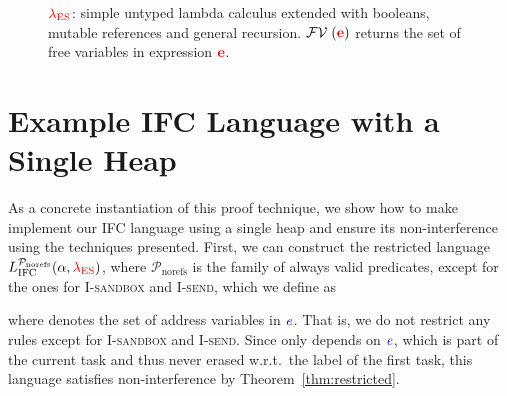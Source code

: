 \documentclass{llncs}
\newcommand{\Varid}[1]{\mathit{#1}}
\newcommand{\Red}[1]{{\color{red} #1}}
\begin{document}
\begin{figure}

\caption{\ensuremath{\Red{\lambda_{\text{ES}}}}: simple untyped lambda calculus extended with booleans,
mutable references and general recursion. \ensuremath{\mathcal{FV}\;(\tar{e})} returns the set of free
variables in expression \ensuremath{\tar{e}}.}
\label{fig:ml-full}
\end{figure}



\section{Example IFC Language with a Single Heap}
\label{sec:single-heap}

As a concrete instantiation of this proof technique, we show
how to make implement our IFC language using a single heap and
ensure its non-interference using the techniques presented.
First, we can construct the restricted language
\ensuremath{L_\text{IFC}^{\mathcal{P}_\text{norefs}}(\alpha,\Red{\lambda_{\text{ES}}})}, where \ensuremath{\mathcal{P}_\text{norefs}} is
the family of always valid predicates, except for the ones for
\textsc{I-sandbox} and \textsc{I-send}, which we define as

where  denotes the set of address variables in \ensuremath{\ifc{\Varid{e}}}.
That is, we do not restrict any rules except for \textsc{I-sandbox}
and \textsc{I-send}.
Since  only depends on \ensuremath{\ifc{\Varid{e}}}, which is part of the current
task and thus never erased w.r.t.\ the label of the first task,
this language satisfies non-interference by Theorem~\ref{thm:restricted}.
\end{document}
